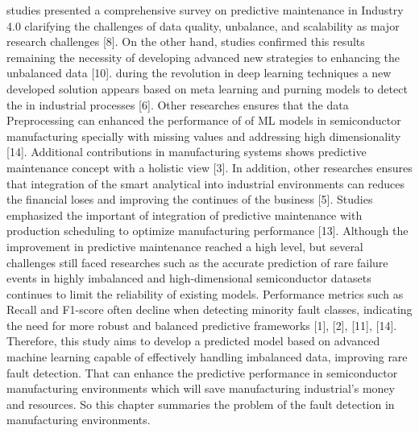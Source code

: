 \documentclass[12pt,oneside]{article}
\begin{document}
studies presented a comprehensive survey on predictive maintenance in Industry 4.0 clarifying the challenges of data quality, unbalance, and scalability as major research challenges [8]. On the other hand, studies confirmed this results remaining the necessity of developing advanced new strategies to enhancing the unbalanced data [10].
during the revolution in deep learning techniques a new developed solution appears based on meta learning and purning models to detect the in industrial processes [6]. Other researches ensures that the data Preprocessing can enhanced the performance of of ML models in semiconductor manufacturing specially with missing values and addressing high dimensionality [14]. 
Additional contributions in manufacturing systems shows predictive maintenance concept with a holistic view [3].  In addition, other researches ensures that integration of the smart analytical into industrial environments can reduces the financial loses and improving the continues of the business [5]. Studies emphasized the important of integration of predictive maintenance with production scheduling to optimize manufacturing performance [13].
Although the improvement in predictive maintenance reached a high level, but several challenges still faced researches such as the accurate prediction of rare failure events in highly imbalanced and high-dimensional semiconductor datasets continues to limit the reliability of existing models. Performance metrics such as Recall and F1-score often decline when detecting minority fault classes, indicating the need for more robust and balanced predictive frameworks [1], [2], [11], [14].
Therefore, this study aims to develop a predicted model based on advanced machine learning capable of effectively handling imbalanced data, improving rare fault detection. That can enhance the predictive performance in semiconductor manufacturing environments which will save manufacturing industrial’s money and resources. So this chapter summaries the problem of the fault detection in manufacturing environments.
\end{document}
